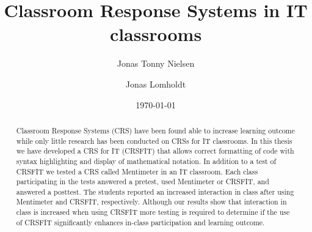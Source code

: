\documentclass{article}
\title{Classroom Response Systems in IT classrooms}
\author{Jonas Tonny Nielsen \and Jonas Lomholdt}
\date{\today}
\begin{document}
\maketitle

\begin{abstract}

Classroom Response Systems (CRS) have been found able to increase learning outcome while only little research has been conducted on CRSs for IT classrooms. In this thesis we have developed a CRS for IT (CRSFIT) that allows correct formatting of code with syntax highlighting and display of mathematical notation. In addition to a test of CRSFIT we tested a CRS called Mentimeter in an IT classroom. Each class participating in the tests answered a pretest, used Mentimeter or CRSFIT, and answered a posttest. The students reported an increased interaction in class after using Mentimeter and CRSFIT, respectively. Although our results show that interaction in class is increased when using CRSFIT more testing is required to determine if the use of CRSFIT significantly enhances in-class participation and learning outcome.


\end{abstract}

\tableofcontents

\clearpage
\listoffigures

\listoftables

\lstlistoflistings


\clearpage
 \clearpage

 \clearpage
 \clearpage
 \clearpage
 \clearpage
 \clearpage
 \clearpage



\clearpage

\end{document}

